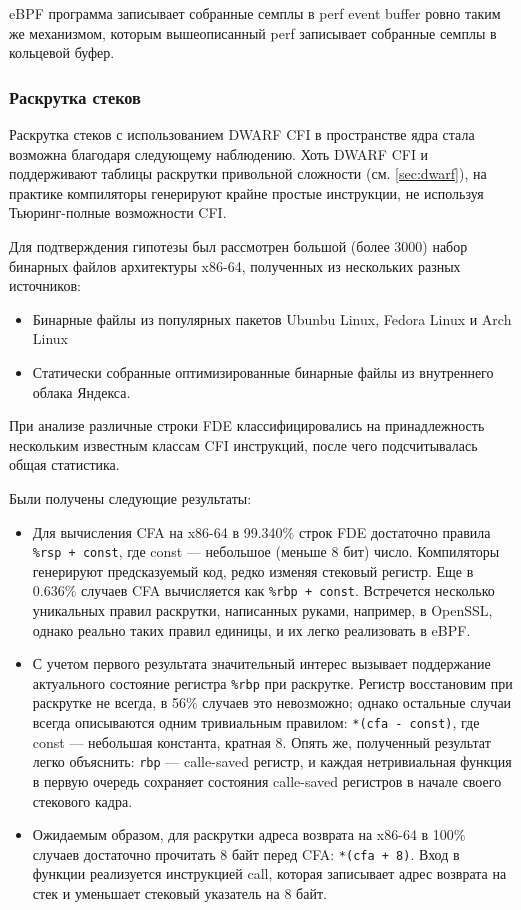 eBPF программа записывает собранные семплы в perf event buffer ровно таким же механизмом, которым вышеописанный perf
записывает собранные семплы в кольцевой буфер.

\subsubsection{Раскрутка стеков}
Раскрутка стеков с использованием DWARF CFI в пространстве ядра стала возможна благодаря следующему наблюдению.
Хоть DWARF CFI и поддерживают таблицы раскрутки привольной сложности (см. \ref{sec:dwarf}),
на практике компиляторы генерируют крайне простые инструкции, не используя Тьюринг-полные возможности CFI.

Для подтверждения гипотезы был рассмотрен большой (более 3000) набор бинарных файлов архитектуры x86-64,
полученных из нескольких разных источников:
\begin{itemize}
    \item Бинарные файлы из популярных пакетов Ubunbu Linux, Fedora Linux и Arch Linux
    \item Статически собранные оптимизированные бинарные файлы из внутреннего облака Яндекса.
\end{itemize}
При анализе различные строки FDE классифицировались на принадлежность нескольким известным классам CFI инструкций, после чего
подсчитывалась общая статистика.

Были получены следующие результаты:
\begin{itemize}
    \item
        Для вычисления CFA на x86-64 в 99.340\% строк FDE достаточно правила \verb!%rsp + const!,
        где const --- небольшое (меньше 8 бит) число.
        Компиляторы генерируют предсказуемый код, редко изменяя стековый регистр.
        Еще в 0.636\% случаев CFA вычисляется как \verb!%rbp + const!.
        Встречется несколько уникальных правил раскрутки, написанных руками, например, в OpenSSL, однако
        реально таких правил единицы, и их легко реализовать в eBPF.

    \item
        С учетом первого результата значительный интерес вызывает поддержание актуального состояние регистра \verb!%rbp! при раскрутке.
        Регистр восстановим при раскрутке не всегда, в 56\% случаев это невозможно; однако остальные
        случаи всегда описываются одним тривиальным правилом: \verb!*(cfa - const)!, где const --- небольшая константа, кратная 8.
        Опять же, полученный результат легко объяснить: \verb!rbp! --- calle-saved регистр, и каждая нетривиальная функция в первую очередь
        сохраняет состояния calle-saved регистров в начале своего стекового кадра.

    \item
        Ожидаемым образом, для раскрутки адреса возврата на x86-64 в 100\% случаев достаточно прочитать 8 байт перед CFA: \verb!*(cfa + 8)!.
        Вход в функции реализуется инструкцией call, которая записывает адрес возврата на стек и уменьшает стековый указатель на 8 байт.
\end{itemize}


